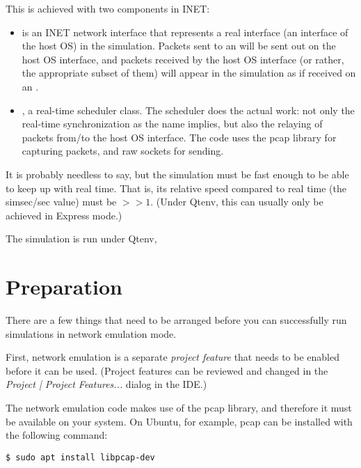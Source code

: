 This is achieved with two components in INET:

\begin{itemize}
  \item {} is an INET network interface that represents 
    a real interface (an interface of the host OS) in the simulation.
    Packets sent to an  will be sent out on the
    host OS interface, and packets received by the host OS interface 
    (or rather, the appropriate subset of them) will appear in the 
    simulation as if received on an .
 \item {}, a real-time scheduler class.
    The scheduler does the actual work: not only the real-time 
    synchronization as the name implies, but also the relaying of packets
    from/to the host OS interface. The code uses the pcap library for 
    capturing packets, and raw sockets for sending.
\end{itemize}

\begin{note}
It is probably needless to say, but the simulation must be fast enough 
to be able to keep up with real time. That is, its relative speed compared
to real time (the simsec/sec value) must be $>>1$.  (Under Qtenv, this
can usually only be achieved in Express mode.)
\end{note}

The simulation is run under Qtenv, 

\section{Preparation}

There are a few things that need to be arranged before you can successfully
run simulations in network emulation mode.

First, network emulation is a separate \textit{project feature} that needs to
be enabled before it can be used. (Project features can be reviewed and changed
in the \emph{Project | Project Features...} dialog in the IDE.) 

The network emulation code makes use of the pcap library, and therefore 
it must be available on your system. On Ubuntu, for example, pcap can be
installed with the following command: 

\begin{verbatim}
$ sudo apt install libpcap-dev 
\end{verbatim}

